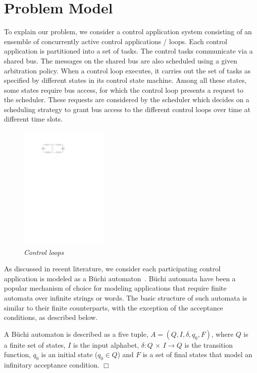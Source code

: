 \section{Problem Model} \label{sec3}
\noindent
To explain our problem, we consider a control application system consisting of an ensemble of concurrently active control applications / loops. Each control application is partitioned into a set of
tasks. The control tasks communicate via a shared bus. The messages on the shared bus are also scheduled using a given arbitration policy. When a control loop executes, it carries out the set of 
tasks as specified by different states in its control state machine. Among all these states, some
states require bus access, for which the control loop presents a request to the scheduler.
These requests are considered by the scheduler which decides on a scheduling strategy to grant bus access to the different control loops over time at different time slots. \\

\begin{figure}
\begin{center}
\includegraphics[width=43mm]{control_diagram.pdf}
\end{center}
\vspace{-0.1in}
\caption{{\em  Control loops}}
\label{state}
\end{figure}

\noindent
As discussed in recent literature, we consider each participating control application is modeled as a B\"{u}chi automaton~\cite{leeuwen90/Thomas90}. 
B\"{u}chi automata have been a popular mechanism of choice for modeling applications that require finite automata over infinite strings or words.
The basic structure of such automata is similar to their finite counterparts, with the exception of the acceptance conditions, as described below.
\begin{definition}
A B\"{u}chi automaton is described as a five tuple, 
$A = (Q,I,\delta,q_0,F)$, where $Q$ is a finite set of states, $I$ is the input alphabet, $\delta : Q$ $\times$ $I \rightarrow Q $ is the transition function, $q_0$ 
is an initial state ($q_0 \in Q$) and $F$ is a set of final states that model an infinitary acceptance condition. $\Box$ 
\end{definition}

